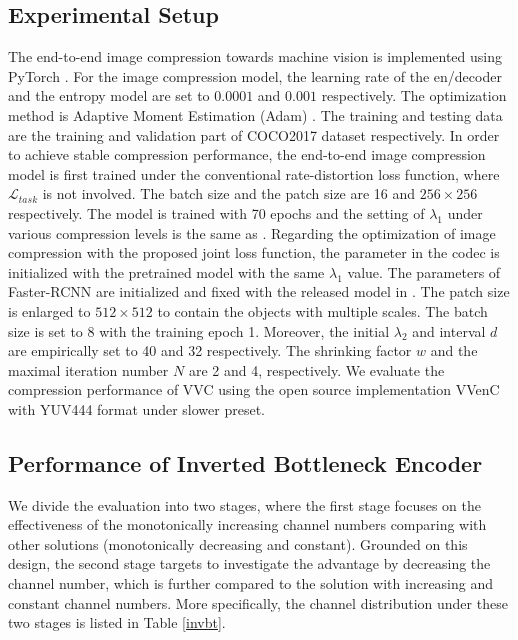 \documentclass[transmag]{IEEEtran}
\newcommand{\sr}[1]{{\color{blue} #1}}
\begin{document}
\subsection{Experimental Setup}
The end-to-end image compression towards machine vision is implemented using PyTorch \cite{paszke2019pytorch}. For the image compression model, the learning rate of the en/decoder and the entropy model are set to $0.0001$ and $0.001$ respectively. The optimization method is Adaptive Moment Estimation (Adam) \cite{kingma2014adam}. 
The training and testing data are the training and validation part of COCO2017 dataset \cite{lin2014microsoft} respectively. 
In order to achieve stable compression performance, the end-to-end image compression model is first trained under the conventional rate-distortion loss function, where $\mathcal{L}_{task}$ is not involved. The batch size and the patch size are 16 and $256\times 256$ respectively. The model is trained with 70 epochs and the setting of $\lambda_{1}$ under various compression levels is the same as \cite{begaint2020compressai}. 
Regarding the optimization of image compression with the proposed joint loss function, the parameter in the codec is initialized with the pretrained model with the same $\lambda_{1}$ value. The parameters of Faster-RCNN are initialized and fixed with the released model in \cite{wu2019detectron2}. The patch size is enlarged to $512\times 512$ to contain the objects with multiple scales. The batch size is set to 8 with the training epoch 1. Moreover, the initial $\lambda_{2}$ and interval $d$ are empirically set to 40 and 32 respectively. The shrinking factor $w$ and the maximal iteration number $N$ are 2 and 4, respectively. We evaluate the compression performance of VVC using the open source implementation VVenC \cite{fraunhofer2020vvenc} with YUV444 format under slower preset.   
\subsection{Performance of Inverted Bottleneck Encoder}

We divide the evaluation into two stages, %
where the first stage focuses on the effectiveness of the monotonically increasing channel numbers comparing with other solutions (monotonically decreasing and constant). Grounded on this design, the second stage targets to  investigate the advantage by decreasing the channel number, which is further compared to the solution with increasing and constant channel numbers. More specifically, the channel distribution under these two stages is listed in Table \ref{invbt}. 
\end{document}
